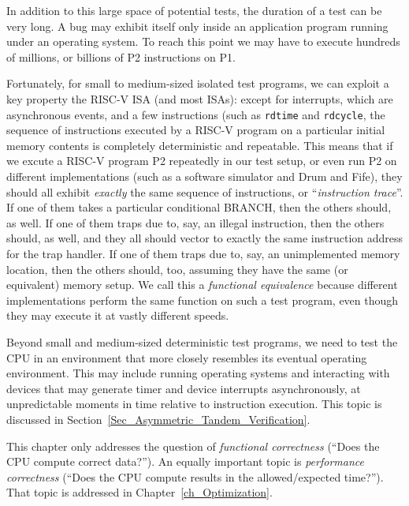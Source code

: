 In addition to this large space of potential tests, the duration of a
test can be very long.  A bug may exhibit itself only inside an
application program running under an operating system.  To reach this
point we may have to execute hundreds of millions, or billions of P2
instructions on P1.

Fortunately, for small to medium-sized isolated test programs, we can
exploit a key property the RISC-V ISA (and most ISAs): except for
interrupts, which are asynchronous events, and a few instructions
(such as \verb|rdtime| and \verb|rdcycle|, the sequence of
instructions executed by a RISC-V program on a particular initial
memory contents is completely deterministic and repeatable.  This
means that if we excute a RISC-V program P2 repeatedly in our test
setup, or even run P2 on different implementations (such as a software
simulator and Drum and Fife), they should all exhibit \emph{exactly}
the same sequence of instructions, or ``\emph{instruction trace}''.
If one of them takes a particular conditional BRANCH, then the others
should, as well.  If one of them traps due to, say, an illegal
instruction, then the others should, as well, and they all should
vector to exactly the same instruction address for the trap handler.
If one of them traps due to, say, an unimplemented memory location,
then the others should, too, assuming they have the same (or
equivalent) memory setup.  We call this a \emph{functional
equivalence} because different implementations perform the same
function on such a test program, even though they may execute it at
vastly different speeds.

Beyond small and medium-sized deterministic test programs, we need to
test the CPU in an environment that more closely resembles its
eventual operating environment.  This may include running operating
systems and interacting with devices that may generate timer and
device interrupts asynchronously, {\ie} at unpredictable moments in
time relative to instruction execution.  This topic is discussed in
Section~\ref{Sec_Asymmetric_Tandem_Verification}.

This chapter only addresses the question of \emph{functional
correctness} (``Does the CPU compute correct data?'').  An equally
important topic is \emph{performance correctness} (``Does the CPU
compute results in the allowed/expected time?'').  That topic is
addressed in Chapter~\ref{ch_Optimization}.


